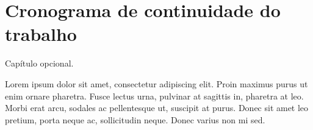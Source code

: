 \chapter{Cronograma de continuidade do trabalho}

Capítulo opcional. 

Lorem ipsum dolor sit amet, consectetur adipiscing elit. Proin maximus purus ut enim ornare pharetra. Fusce lectus urna, pulvinar at sagittis in, pharetra at leo. Morbi erat arcu, sodales ac pellentesque ut, suscipit at purus. Donec sit amet leo pretium, porta neque ac, sollicitudin neque. Donec varius non mi sed.